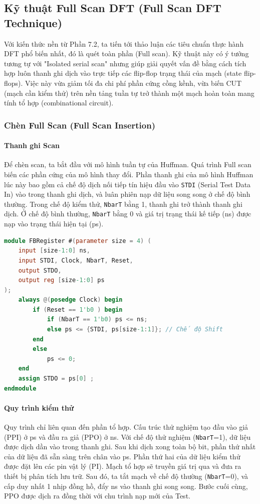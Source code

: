 \subsection{Kỹ thuật Full Scan DFT (Full Scan DFT Technique)}
Với kiến thức nền từ Phần 7.2, ta tiến tới thảo luận các tiêu chuẩn thực hành DFT phổ biến nhất, đó là quét toàn phần (Full scan). Kỹ thuật này có ý tưởng tương tự với "Isolated serial scan" nhưng giúp giải quyết vấn đề bằng cách tích hợp luôn thanh ghi dịch vào trực tiếp các flip-flop trạng thái của mạch (state flip-flops). Việc này vừa giảm tối đa chi phí phần cứng cồng kềnh, vừa biến CUT (mạch cần kiểm thử) trên nền tảng tuần tự trở thành một mạch hoàn toàn mang tính tổ hợp (combinational circuit).

\subsubsection{Chèn Full Scan (Full Scan Insertion)}
\paragraph{Thanh ghi Scan}
Để chèn scan, ta bắt đầu với mô hình tuần tự của Huffman. Quá trình Full scan biến các phần cứng của mô hình thay đổi. Phần thanh ghi của mô hình Huffman lúc này bao gồm cả chế độ dịch nối tiếp tín hiệu đầu vào \texttt{STDI} (Serial Test Data In) vào trong thanh ghi dịch, và luân phiên nạp dữ liệu song song ở chế độ bình thường.
Trong chế độ kiểm thử, \texttt{NbarT} bằng 1, thanh ghi trở thành thanh ghi dịch. Ở chế độ bình thường, \texttt{NbarT} bằng 0 và giá trị trạng thái kế tiếp (ns) được nạp vào trạng thái hiện tại (ps).

\begin{lstlisting}[language=Verilog, caption={Mô hình thanh ghi phản hồi thử nghiệm kiểu Huffman}]
module FBRegister #(parameter size = 4) (
    input [size-1:0] ns, 
    input STDI, Clock, NbarT, Reset, 
    output STDO,
    output reg [size-1:0] ps
);
    always @(posedge Clock) begin
        if (Reset == 1'b0 ) begin
            if (NbarT == 1'b0) ps <= ns; 
            else ps <= {STDI, ps[size-1:1]}; // Chế độ Shift
        end
        else
            ps <= 0;  
    end
    assign STDO = ps[0] ;
endmodule
\end{lstlisting}

\paragraph{Quy trình kiểm thử}
Quy trình chỉ liên quan đến phần tổ hợp. Cấu trúc thử nghiệm tạo đầu vào giả (PPI) ở ps và đầu ra giả (PPO) ở ns. Với chế độ thử nghiệm (\texttt{NbarT}=1), dữ liệu được dịch dần vào trong thanh ghi. Sau khi dịch xong toàn bộ bit, phần thứ nhất của dữ liệu đã sẵn sàng trên chân vào ps. Phần thứ hai của dữ liệu kiểm thử được đặt lên các pin vật lý (PI). Mạch tổ hợp sẽ truyền giá trị qua và đưa ra thiết bị phân tích lưu trữ. Sau đó, ta tắt mạch về chế độ thường (\texttt{NbarT}=0), và cấp duy nhất 1 nhịp đồng hồ, đẩy ns vào thanh ghi song song. Bước cuối cùng, PPO được dịch ra đồng thời với chu trình nạp mới của Test.

